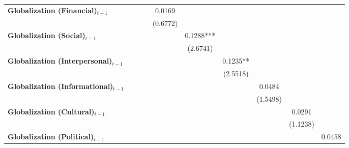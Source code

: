 \begin{center}
\begin{tabular}{lccccccccc}
\textbf{Globalization (Financial)$_{t-1}$}             &                &                  &                  &      0.0169      &                  &                  &                  &                  &                   \\
\textbf{ }                         &                &                  &                  &     (0.6772)     &                  &                  &                  &                  &                   \\
\textbf{Globalization (Social)$_{t-1}$}             &                &                  &                  &                  &    0.1288***     &                  &                  &                  &                   \\
\textbf{ }                         &                &                  &                  &                  &     (2.6741)     &                  &                  &                  &                   \\
\textbf{Globalization (Interpersonal)$_{t-1}$}             &                &                  &                  &                  &                  &     0.1235**     &                  &                  &                   \\
\textbf{ }                         &                &                  &                  &                  &                  &     (2.5518)     &                  &                  &                   \\
\textbf{Globalization (Informational)$_{t-1}$}             &                &                  &                  &                  &                  &                  &      0.0484      &                  &                   \\
\textbf{ }                         &                &                  &                  &                  &                  &                  &     (1.5498)     &                  &                   \\
\textbf{Globalization (Cultural)$_{t-1}$}             &                &                  &                  &                  &                  &                  &                  &      0.0291      &                   \\
\textbf{ }                         &                &                  &                  &                  &                  &                  &                  &     (1.1238)     &                   \\
\textbf{Globalization (Political)$_{t-1}$}             &                &                  &                  &                  &                  &                  &                  &                  &      0.0458       \\

\end{tabular}
\end{center}

